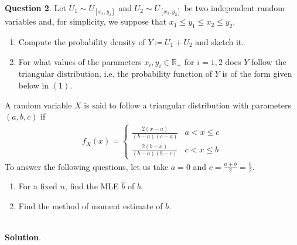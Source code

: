 \documentclass{article}
\begin{document}
\textbf{Question 2}. Let $U_1 \sim U_{[x_1, y_1]}$ and $U_2 \sim U_{[x_2,y_2]}$ be two independent random variables and, for simplicity, we suppose that $x_1 \leq y_1 \leq x_2 \leq y_2$.
\begin{enumerate}
  \item Compute the probability density of $Y \coloneqq U_1 + U_2$ and sketch it.
  \item For what values of the parameters $x_i, y_i \in \mathbb{R}_+$ for $i = 1, 2$ does $Y$ follow the triangular distribution, i.e. the probability function of $Y$ is of the form given below in $(1)$.
\end{enumerate}
A random variable $X$ is said to follow a triangular distribution with parameters $(a,b,c)$ if
\begin{align}
  f_X(x) = \begin{cases} \frac{2(x-a)}{(b-a)(c-a)} & a < x \leq c \\ \frac{2(b-x)}{(b-a)(b-c)} & c < x \leq b \end{cases}
\end{align}
To answer the following questions, let us take $a = 0$ and $c = \frac{a+b}{2} = \frac{b}{2}$.
\begin{enumerate}
  \addtocounter{enumi}{2}
  \item For a fixed $n$, find the MLE $\hat{b}$ of $b$.
  \item Find the method of moment estimate of $b$.
\end{enumerate}~\\
\textbf{Solution}.
\end{document}
